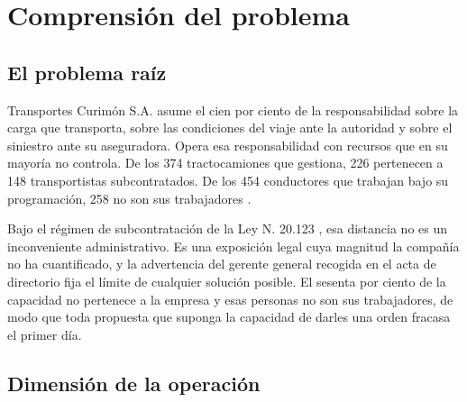 \section{Comprensión del problema}

\subsection{El problema raíz}

Transportes Curimón S.A. asume el cien por ciento de la responsabilidad sobre la carga que
transporta, sobre las condiciones del viaje ante la autoridad y sobre el siniestro ante su
aseguradora. Opera esa responsabilidad con recursos que en su mayoría no controla. De los 374
tractocamiones que gestiona, 226 pertenecen a 148 transportistas subcontratados. De los 454
conductores que trabajan bajo su programación, 258 no son sus trabajadores
\parencite{bases_caso10_2026}.

Bajo el régimen de subcontratación de la Ley N.\textordmasculine{} 20.123 \parencite{ley20123}, esa
distancia no es un inconveniente administrativo. Es una exposición legal cuya magnitud la compañía
no ha cuantificado, y la advertencia del gerente general recogida en el acta de directorio fija el
límite de cualquier solución posible. El sesenta por ciento de la capacidad no pertenece a la
empresa y esas personas no son sus trabajadores, de modo que toda propuesta que suponga la
capacidad de darles una orden fracasa el primer día.

\subsection{Dimensión de la operación}

